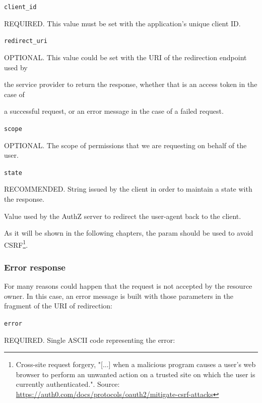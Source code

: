 \texttt{client\_id}

\hspace{0.5cm}REQUIRED. This value must be set with the application's unique client ID.

\texttt{redirect\_uri}

\hspace{0.5cm}OPTIONAL. This value could be set with the URI of the redirection endpoint used by 

\hspace{0.5cm}the service provider to return the response, whether that is an access token in the case of

\hspace{0.5cm} a successful request, or an error message in the case of a failed request.

\texttt{scope}

\hspace{0.5cm}OPTIONAL. The scope of permissions that we are requesting on behalf of the user.

\vspace{0.5cm}

\texttt{state}

\hspace{0.5cm}RECOMMENDED. String issued by the client in order to maintain a state with the response.

\hspace{0.5cm}Value used by the AuthZ server to redirect the user-agent back to the client.

\hspace{0.5cm}As it will be shown in the following chapters, the param should be used to avoid CSRF\footnote{Cross-site request forgery, "[...] when a malicious program causes a user's web browser to perform an unwanted action on a trusted site on which the user is currently authenticated.". Source: \url{https://auth0.com/docs/protocols/oauth2/mitigate-csrf-attacks}}.

\subsubsection{Error response}
\label{tokenerr}
For many reasons could happen that the request is not accepted by the resource owner. In this case, an error message is built with those parameters in the fragment of the URI of redirection:

\texttt{error}

\hspace{0.5cm}REQUIRED. Single ASCII code representing the error:

